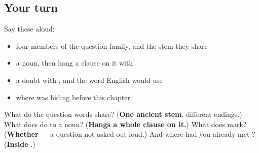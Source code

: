\subsection*{Your turn}
Say these aloud:

\begin{itemize}
\raggedright
  \item four members of the question family, and the stem they share
  \item a noun, then hang a clause on it with 
  \item a doubt with , and the word English would use
  \item where  was hiding before this chapter
\end{itemize}

\begin{tcolorbox}[breakable,colback=teal!4,colframe=teal!35!black,title={Before you move on}]
What do the question words share? (\textbf{One ancient stem}, different endings.) What does \textbf{} do to a noun? (\textbf{Hangs a whole clause on it.}) What does \textbf{} mark? (\textbf{Whether} — a question not asked out loud.) And where had you already met \textbf{}? (\textbf{Inside }.)
\end{tcolorbox}
